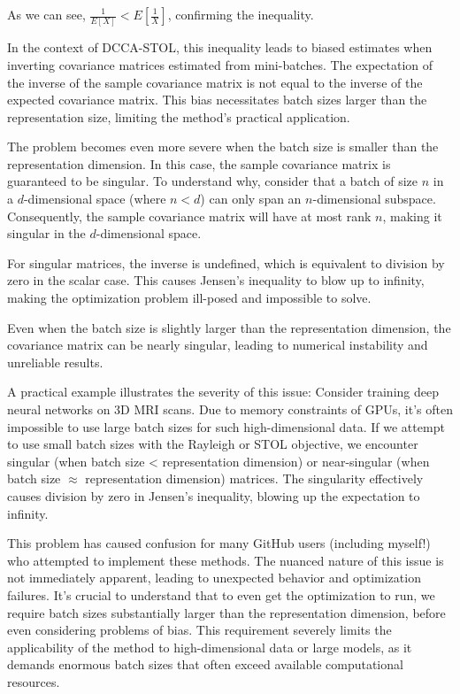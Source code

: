 As we can see, $\frac{1}{E[X]} < E[\frac{1}{X}]$, confirming the inequality. 

In the context of DCCA-STOL, this inequality leads to biased estimates when inverting covariance matrices estimated from mini-batches. The expectation of the inverse of the sample covariance matrix is not equal to the inverse of the expected covariance matrix. This bias necessitates batch sizes larger than the representation size, limiting the method's practical application.

The problem becomes even more severe when the batch size is smaller than the representation dimension. In this case, the sample covariance matrix is guaranteed to be singular. To understand why, consider that a batch of size $n$ in a $d$-dimensional space (where $n < d$) can only span an $n$-dimensional subspace. Consequently, the sample covariance matrix will have at most rank $n$, making it singular in the $d$-dimensional space.

For singular matrices, the inverse is undefined, which is equivalent to division by zero in the scalar case. This causes Jensen's inequality to blow up to infinity, making the optimization problem ill-posed and impossible to solve.

Even when the batch size is slightly larger than the representation dimension, the covariance matrix can be nearly singular, leading to numerical instability and unreliable results.

A practical example illustrates the severity of this issue: Consider training deep neural networks on 3D MRI scans. Due to memory constraints of GPUs, it's often impossible to use large batch sizes for such high-dimensional data. If we attempt to use small batch sizes with the Rayleigh or STOL objective, we encounter singular (when batch size < representation dimension) or near-singular (when batch size $\approx$ representation dimension) matrices. The singularity effectively causes division by zero in Jensen's inequality, blowing up the expectation to infinity.

This problem has caused confusion for many GitHub users (including myself!) who attempted to implement these methods. The nuanced nature of this issue is not immediately apparent, leading to unexpected behavior and optimization failures. It's crucial to understand that to even get the optimization to run, we require batch sizes substantially larger than the representation dimension, before even considering problems of bias. This requirement severely limits the applicability of the method to high-dimensional data or large models, as it demands enormous batch sizes that often exceed available computational resources.

